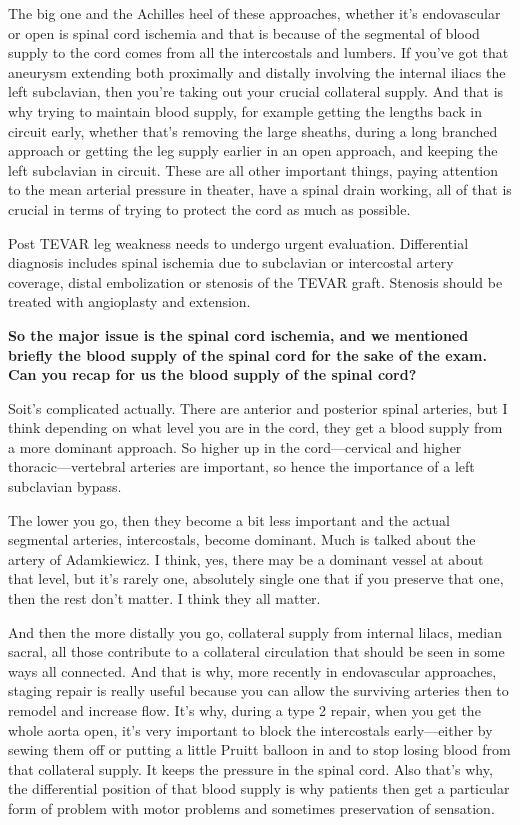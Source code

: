 \documentclass[
]{book}
\begin{document}
The big one and the Achilles heel of these approaches, whether it's
endovascular or open is spinal cord ischemia and that is because of the
segmental of blood supply to the cord comes from all the intercostals
and lumbers. If you've got that aneurysm extending both proximally and
distally involving the internal iliacs the left subclavian, then you're
taking out your crucial collateral supply. And that is why trying to
maintain blood supply, for example getting the lengths back in circuit
early, whether that's removing the large sheaths, during a long branched
approach or getting the leg supply earlier in an open approach, and
keeping the left subclavian in circuit. These are all other important
things, paying attention to the mean arterial pressure in theater, have
a spinal drain working, all of that is crucial in terms of trying to
protect the cord as much as possible.

Post TEVAR leg weakness needs to undergo urgent evaluation. Differential
diagnosis includes spinal ischemia due to subclavian or intercostal
artery coverage, distal embolization or stenosis of the TEVAR graft.
Stenosis should be treated with angioplasty and extension.\citep{buth2007}

\textbf{So the major issue is the spinal cord ischemia, and we mentioned
briefly the blood supply of the spinal cord for the sake of the exam.
Can you recap for us the blood supply of the spinal cord?}

Soit's complicated actually. There are anterior and posterior spinal
arteries, but I think depending on what level you are in the cord, they
get a blood supply from a more dominant approach. So higher up in the
cord---cervical and higher thoracic---vertebral arteries are important,
so hence the importance of a left subclavian bypass.

The lower you go, then they become a bit less important and the actual
segmental arteries, intercostals, become dominant. Much is talked about
the artery of Adamkiewicz. I think, yes, there may be a dominant vessel
at about that level, but it's rarely one, absolutely single one that if
you preserve that one, then the rest don't matter. I think they all
matter.

And then the more distally you go, collateral supply from internal
lilacs, median sacral, all those contribute to a collateral circulation
that should be seen in some ways all connected. And that is why, more
recently in endovascular approaches, staging repair is really useful
because you can allow the surviving arteries then to remodel and
increase flow. It's why, during a type 2 repair, when you get the whole
aorta open, it's very important to block the intercostals early---either
by sewing them off or putting a little Pruitt balloon in and to stop
losing blood from that collateral supply. It keeps the pressure in the
spinal cord. Also that's why, the differential position of that blood
supply is why patients then get a particular form of problem with motor
problems and sometimes preservation of sensation.
\end{document}
